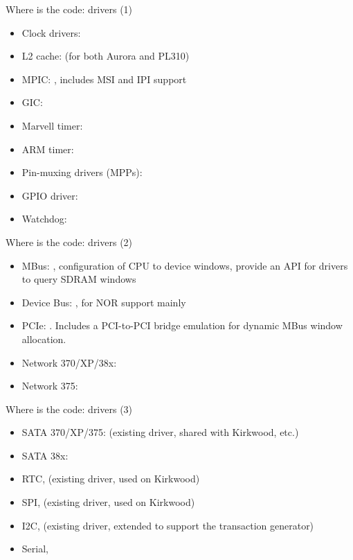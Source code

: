 \begin{frame}{Where is the code: drivers (1)}

\begin{itemize}
\item Clock drivers: 
\item L2 cache:  (for both Aurora and PL310)
\item MPIC: , includes MSI
  and IPI support
\item GIC: 
\item Marvell timer: 
\item ARM timer: 
\item Pin-muxing drivers (MPPs): 
\item GPIO driver: 
\item Watchdog: 
\end{itemize}

\end{frame}

\begin{frame}{Where is the code: drivers (2)}

\begin{itemize}
\item MBus: , configuration of CPU to
  device windows, provide an API for drivers to query SDRAM windows
\item Device Bus: , for NOR
  support mainly
\item PCIe: . Includes a PCI-to-PCI
  bridge emulation for dynamic MBus window allocation.
\item Network 370/XP/38x: 
\item Network 375: 
\end{itemize}

\end{frame}

\begin{frame}{Where is the code: drivers (3)}

\begin{itemize}
\item SATA 370/XP/375:  (existing driver,
  shared with Kirkwood, etc.)
\item SATA 38x: 
\item RTC,  (existing driver, used on Kirkwood)
\item SPI,  (existing driver, used on Kirkwood)
\item I2C,  (existing driver,
  extended to support the transaction generator)
\item Serial, 
\end{itemize}

\end{frame}

